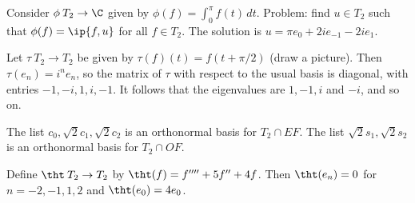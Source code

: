 \begin{example}
 Consider $\phi\:T_2\to\C$ given by $\phi(f)=\int_0^\pi f(t)\,dt$.
 Problem: find $u\in T_2$ such that $\phi(f)=\ip{f,u}$ for all
 $f\in T_2$.  The solution is $u=\pi e_0+2ie_{-1}-2ie_1$.
\end{example}

\begin{example}
 Let $\tau\:T_2\to T_2$ be given by $\tau(f)(t)=f(t+\pi/2)$ (draw a
 picture).  Then $\tau(e_n)=i^ne_n$, so the matrix of $\tau$ with
 respect to the usual basis is diagonal, with entries $-1,-i,1,i,-1$.
 It follows that the eigenvalues are $1,-1,i$ and $-i$, and so on.
\end{example}

\begin{example}
 The list $c_0,\sqrt{2}c_1,\sqrt{2}c_2$ is an orthonormal basis for
 $T_2\cap EF$.  The list $\sqrt{2}s_1,\sqrt{2}s_2$ is an orthonormal
 basis for $T_2\cap OF$.  
\end{example}

\begin{example}
 Define $\tht\:T_2\to T_2$ by $\tht(f)=f''''+5f''+4f$.  Then
 $\tht(e_n)=0$ for $n=-2,-1,1,2$ and $\tht(e_0)=4e_0$.
\end{example}